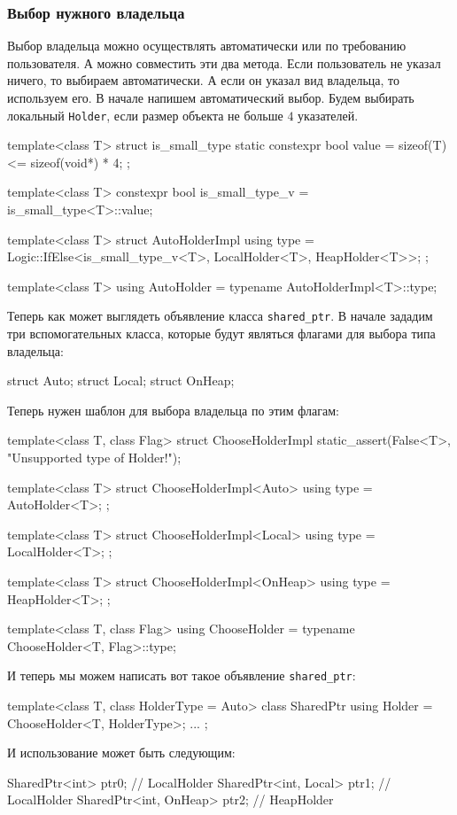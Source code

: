 \subsubsection{Выбор нужного владельца}

Выбор владельца можно осуществлять автоматически или по требованию пользователя.
А можно совместить эти два метода.
Если пользователь не указал ничего, то выбираем автоматически.
А если он указал вид владельца, то используем его.
В начале напишем автоматический выбор.
Будем выбирать локальный \verb"Holder", если размер объекта не больше $4$ указателей.
\begin{cppcode}
template<class T>
struct is_small_type {
  static constexpr bool value = sizeof(T) <= sizeof(void*) * 4;
};

template<class T>
constexpr bool is_small_type_v = is_small_type<T>::value;

template<class T>
struct AutoHolderImpl {
  using type = Logic::IfElse<is_small_type_v<T>, LocalHolder<T>, HeapHolder<T>>;
};

template<class T>
using AutoHolder = typename AutoHolderImpl<T>::type;
\end{cppcode}
Теперь как может выглядеть объявление класса \verb"shared_ptr".
В начале зададим три вспомогательных класса, которые будут являться флагами для выбора типа владельца:
\begin{cppcode}
struct Auto;
struct Local;
struct OnHeap;
\end{cppcode}
Теперь нужен шаблон для выбора владельца по этим флагам:
\begin{cppcode}
template<class T, class Flag>
struct ChooseHolderImpl {
  static_assert(False<T>, "Unsupported type of Holder!");
}

template<class T>
struct ChooseHolderImpl<Auto> {
  using type = AutoHolder<T>;
};

template<class T>
struct ChooseHolderImpl<Local> {
  using type = LocalHolder<T>;
};

template<class T>
struct ChooseHolderImpl<OnHeap> {
  using type = HeapHolder<T>;
};

template<class T, class Flag>
using ChooseHolder = typename ChooseHolder<T, Flag>::type;
\end{cppcode}
И теперь мы можем написать вот такое объявление \verb"shared_ptr":
\begin{cppcode}
template<class T, class HolderType = Auto>
class SharedPtr {
  using Holder = ChooseHolder<T, HolderType>;
  ...
};
\end{cppcode}
И использование может быть следующим:
\begin{cppcode}
SharedPtr<int> ptr0;         // LocalHolder
SharedPtr<int, Local> ptr1;  // LocalHolder
SharedPtr<int, OnHeap> ptr2; // HeapHolder
\end{cppcode}

